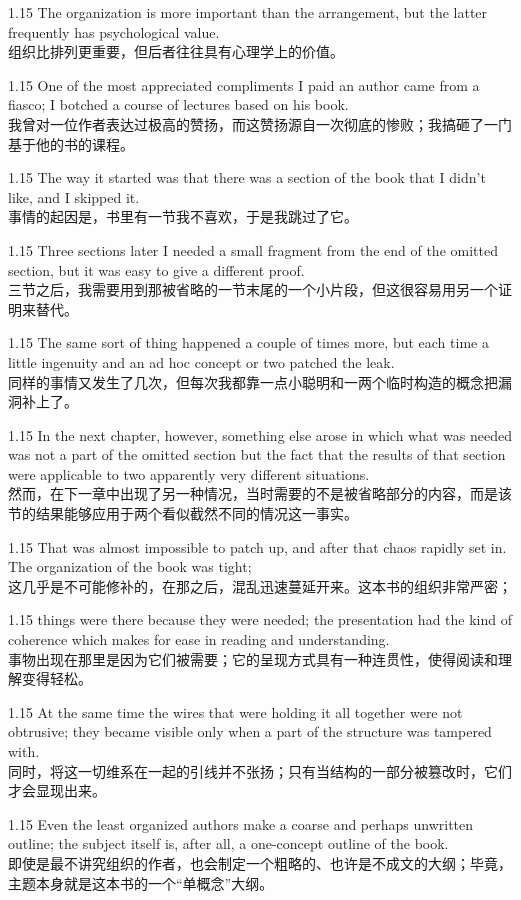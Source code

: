 \documentclass[12pt,a4paper]{article}
\newcommand{\bilingual}[2]{
    \begin{spacing}{1.15} %
        \noindent \normalsize #1 \\[-0.5ex] %
        \small \textcolor{blue!70!black}{#2} %
    \end{spacing}
    \vspace{0.8em} %
}
\begin{document}
\bilingual{The organization is more important than the arrangement, but the latter frequently has psychological value.}
{组织比排列更重要，但后者往往具有心理学上的价值。} %

\bilingual{One of the most appreciated compliments I paid an author came from a fiasco; I botched a course of lectures based on his book.}
{我曾对一位作者表达过极高的赞扬，而这赞扬源自一次彻底的惨败；我搞砸了一门基于他的书的课程。} %

\bilingual{The way it started was that there was a section of the book that I didn't like, and I skipped it.}
{事情的起因是，书里有一节我不喜欢，于是我跳过了它。} %

\bilingual{Three sections later I needed a small fragment from the end of the omitted section, but it was easy to give a different proof.}
{三节之后，我需要用到那被省略的一节末尾的一个小片段，但这很容易用另一个证明来替代。} %

\bilingual{The same sort of thing happened a couple of times more, but each time a little ingenuity and an ad hoc concept or two patched the leak.}
{同样的事情又发生了几次，但每次我都靠一点小聪明和一两个临时构造的概念把漏洞补上了。} %

\bilingual{In the next chapter, however, something else arose in which what was needed was not a part of the omitted section but the fact that the results of that section were applicable to two apparently very different situations.}
{然而，在下一章中出现了另一种情况，当时需要的不是被省略部分的内容，而是该节的结果能够应用于两个看似截然不同的情况这一事实。} %

\bilingual{That was almost impossible to patch up, and after that chaos rapidly set in. The organization of the book was tight;}
{这几乎是不可能修补的，在那之后，混乱迅速蔓延开来。这本书的组织非常严密；} %

\bilingual{things were there because they were needed; the presentation had the kind of coherence which makes for ease in reading and understanding.}
{事物出现在那里是因为它们被需要；它的呈现方式具有一种连贯性，使得阅读和理解变得轻松。} %

\bilingual{At the same time the wires that were holding it all together were not obtrusive; they became visible only when a part of the structure was tampered with.}
{同时，将这一切维系在一起的引线并不张扬；只有当结构的一部分被篡改时，它们才会显现出来。} %

\bilingual{Even the least organized authors make a coarse and perhaps unwritten outline; the subject itself is, after all, a one-concept outline of the book.}
{即使是最不讲究组织的作者，也会制定一个粗略的、也许是不成文的大纲；毕竟，主题本身就是这本书的一个“单概念”大纲。} %
\end{document}
